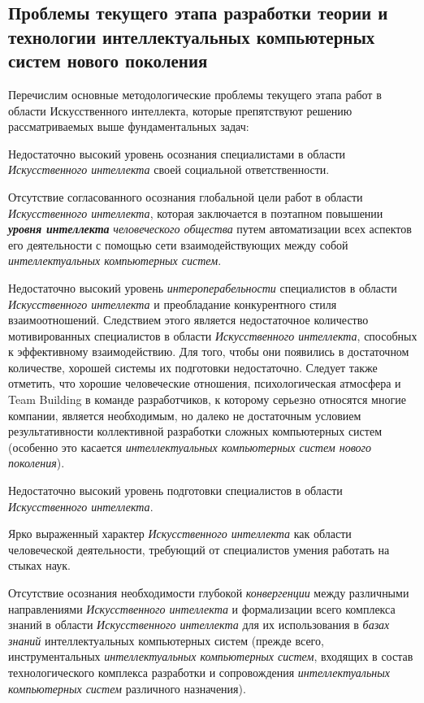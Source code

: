 \subsection*{Проблемы текущего этапа разработки теории и технологии интеллектуальных компьютерных систем нового поколения}
Перечислим основные методологические проблемы текущего этапа работ в области Искусственного интеллекта, которые препятствуют решению рассматриваемых выше фундаментальных задач:
\begin{textitemize}
	\item 
	Недостаточно высокий уровень осознания специалистами в области \textit{Искусственного интеллекта} своей социальной ответственности.
	\medskip
	\item 
	Отсутствие согласованного осознания глобальной цели работ в области \textit{Искусственного интеллекта}, которая заключается в поэтапном повышении \textbf{\textit{уровня интеллекта}} \textit{человеческого общества} путем  автоматизации всех аспектов его деятельности с помощью сети взаимодействующих между собой \textit{интеллектуальных компьютерных систем}.
	\medskip
	\item 
	Недостаточно высокий уровень \textit{интероперабельности} специалистов в области \textit{Искусственного интеллекта} и преобладание конкурентного стиля взаимоотношений. Следствием этого является недостаточное количество мотивированных специалистов в области \textit{Искусственного интеллекта}, способных к эффективному  взаимодействию. Для того, чтобы они появились в достаточном количестве, хорошей системы их  подготовки недостаточно. Следует также отметить, что хорошие человеческие отношения, психологическая атмосфера и Team Building в команде разработчиков, к которому серьезно относятся многие компании, является необходимым, но далеко не достаточным условием результативности коллективной разработки сложных компьютерных систем (особенно это касается \textit{интеллектуальных компьютерных систем нового поколения}).
	\medskip
	\item 
	Недостаточно высокий уровень  подготовки специалистов в области \textit{Искусственного интеллекта}.
	\medskip
	\item 
	Ярко выраженный  характер \textit{Искусственного интеллекта} как области человеческой деятельности, требующий от специалистов умения работать на стыках наук.
	\medskip
	\item 
	Отсутствие осознания необходимости глубокой \textit{конвергенции} между различными направлениями \textit{Искусственного интеллекта} и формализации всего комплекса знаний в области \textit{Искусственного интеллекта} для их использования в \textit{базах знаний} интеллектуальных компьютерных систем (прежде всего, инструментальных \textit{интеллектуальных компьютерных систем}, входящих в состав технологического комплекса разработки и сопровождения \textit{интеллектуальных компьютерных систем} различного назначения).

\end{textitemize}

